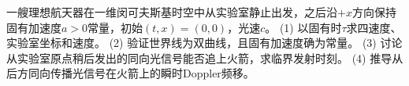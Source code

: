一艘理想航天器在一维闵可夫斯基时空中从实验室静止出发，之后沿\(+x\)方向保持固有加速度\(a>0\)常量，初始\((t,x)=(0,0)\)，光速\(c\)。
(1) 以固有时\(\tau\)求四速度、实验室坐标和速度。
(2) 验证世界线为双曲线，且固有加速度确为常量。
(3) 讨论从实验室原点稍后发出的同向光信号能否追上火箭，求临界发射时刻。
(4) 推导从后方同向传播光信号在火箭上的瞬时Doppler频移。
